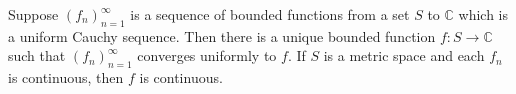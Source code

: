 Suppose $(f_n)_{n=1}^{\infty}$ is a sequence of bounded functions from a set $S$ to $\mathbb{C}$ which is a uniform Cauchy sequence. Then there is a unique bounded function $f: S \to \mathbb{C}$ such that $(f_n)_{n=1}^{\infty}$ converges uniformly to $f$. If $S$ is a metric space and each $f_n$ is continuous, then $f$ is continuous.
